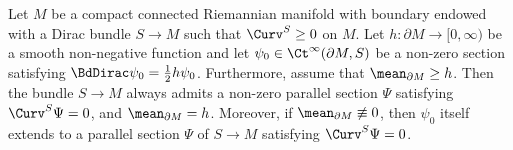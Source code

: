 \documentclass[a4paper,11pt]{amsart}
\numberwithin{equation}{section}
\begin{document}
\begin{lemma}\label{extension_lemma}
    Let \(M\) be a compact connected Riemannian manifold with boundary endowed with a Dirac bundle \(S \to M\) such that \(\Curv^S \geq 0\) on \(M\). 
    Let \(h \colon \partial M \to [0,\infty)\) be a smooth non-negative function and let \(\psi_0 \in \Ct^\infty(\partial M, S)\) be a non-zero section satisfying \(\BdDirac \psi_0 = \frac{1}{2} h \psi_0\).
    Furthermore, assume that \(\mean_{\partial M} \geq h\).
    Then the bundle \(S \to M\) always admits a non-zero parallel section \(\Psi\) satisfying \(\Curv^S\Psi = 0\), and \(\mean_{\partial M} = h\).
    Moreover, if \(\mean_{\partial M} \not\equiv 0\), then \(\psi_0\) itself extends to a parallel section \(\Psi\) of \(S \to M\) satisfying \(\Curv^S\Psi = 0\).
\end{lemma}
\end{document}
